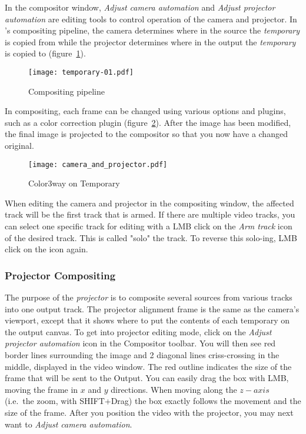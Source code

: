 In the compositor window, \textit{Adjust camera automation} and \textit{Adjust projector automation}
are editing tools to control operation of the camera and projector.  In \CGG{}'s compositing
pipeline, the camera determines where in the source the \textit{temporary} is copied from while
the projector determines where in the output the \textit{temporary} is copied to
(figure~\ref{fig:temporary-01}). 

\begin{figure}[htpb]
    \centering
    \texttt{[image: temporary-01.pdf]}
    \caption{Compositing pipeline}
    \label{fig:temporary-01}
\end{figure}

In compositing, each frame can be changed using various options and plugins, such as
a color correction plugin (figure~\ref{fig:camera_and_projector}).  After the image has been
modified, the final image is projected to the compositor so that you now have a changed original.

\begin{figure}[htpb]
    \centering
    \texttt{[image: camera\_and\_projector.pdf]}
    \caption{Color3way on Temporary}
    \label{fig:camera_and_projector}
\end{figure}

When editing the camera and projector in the compositing window, the affected track will be the
first track that is armed.  If there are multiple video tracks, you can select one specific track
for editing with a LMB click on the \textit{Arm track} icon of the desired track. This is called
"solo" the track. To reverse this solo-ing, LMB click on the icon again. 

\subsubsection*{Projector Compositing}%
\label{ssub:projector_compositing}

The purpose of the \textit{projector} is to composite several sources from various tracks into one
output track.  The projector alignment frame is the same as the camera's viewport, except that it
shows where to put the contents of each temporary on the output canvas.  To get into projector
editing mode, click on the \textit{Adjust projector automation} icon in the Compositor toolbar. You
will then see red border lines surrounding the image and 2 diagonal lines criss-crossing in the 
middle, displayed in the video window.  The red outline indicates the size of the frame that will be
sent to the Output. You can easily drag the box with LMB, moving the frame in $x$ and $y$ directions.
When moving along the $z-axis$ (i.e.\ the zoom, with SHIFT+Drag) the box exactly follows the movement
and the size of the frame. After you position the video with the projector, you may next want to
\textit{Adjust camera automation}.

